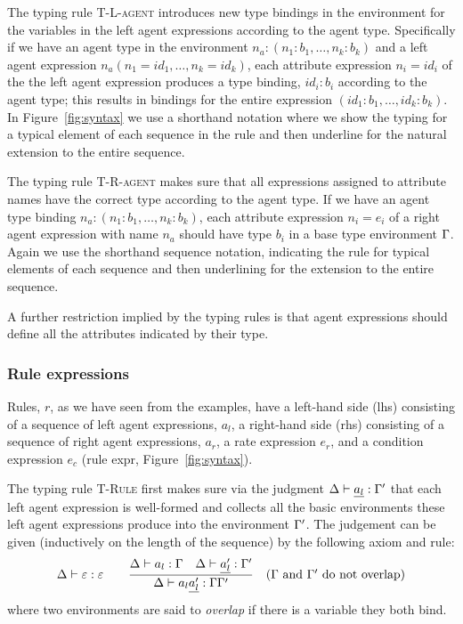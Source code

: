 The typing rule \textsc{T-L-agent} introduces new type bindings in the environment for the variables in the left agent expressions according to the agent type. Specifically if we have an agent type in the environment $n_a : (n_1: b_1, \dots, n_k: b_k)$ and a left agent expression $n_a(n_1 = id_1, \dots, n_k = id_k)$, each attribute expression $n_i = id_i$ of the %
the left agent expression produces a type binding, $id_i:b_i$ according to the agent type; this results  in bindings for the entire expression $(id_1: b_1, \dots, id_k: b_k)$. In Figure~\ref{fig:syntax} we use a shorthand notation where we show the typing for a typical element of each sequence in the rule and then underline for the natural extension to the entire sequence. 

The typing rule \textsc{T-R-agent} makes sure that all expressions assigned to attribute names have the correct type according to the agent type. If we have an agent type binding 
$n_a: (n_1:b_1, \dots, n_k:b_k)$, each attribute expression $n_i = e_i$ of a right agent expression with name $n_a$ should have type $b_i$ in a base type environment $\Gamma$. Again we use the shorthand sequence notation, indicating the rule for typical elements of each sequence and then underlining for the extension to the entire sequence. 

A further restriction implied by the typing rules is that agent expressions should 
define all the attributes indicated by their type.


\subsubsection*{Rule expressions}
Rules, $r$, as we have seen from the examples, have a left-hand side (lhs) consisting of a sequence of left agent expressions, $a_l$, a right-hand side (rhs) consisting of a sequence of right agent expressions, $a_r$, a rate expression $e_r$, and a condition expression $e_c$ (\textsf{rule expr}, Figure~\ref{fig:syntax}). 

The typing rule \textsc{T-Rule} first makes sure via the judgment $\Delta \vdash \underline{a_l} : \Gamma'$ that each left agent expression is well-formed and collects all the basic environments these left agent expressions produce into the environment $\Gamma'$. The judgement can be given (inductively on the length of the sequence) by the following axiom and rule:
%
\[\Delta \vdash \varepsilon:\varepsilon   \qquad \frac{\Delta  \vdash a_l : \Gamma  \quad \Delta  \vdash \underline{a'_l}: \Gamma'}{\Delta  \vdash a_l \underline{a'_l}: \Gamma\Gamma'} \quad (\mbox{$\Gamma$ and $\Gamma'$ do not overlap} )\]
%
where two environments are said to \emph{overlap} if there is a variable they both bind.

